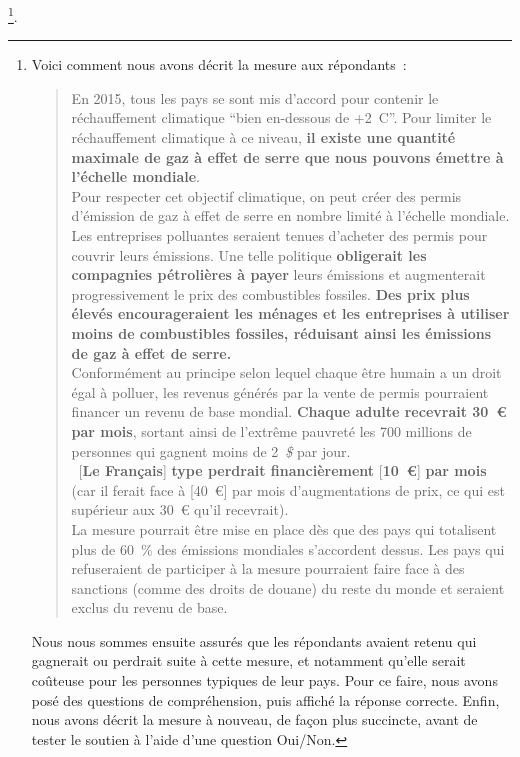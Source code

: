 \documentclass[a5paper,french,openany]{memoir}
\begin{document}
\footnote{\label{fn15}
Voici comment nous avons décrit la mesure aux répondants~:
\begin{quote}
En 2015, tous les pays se sont mis d'accord pour contenir le réchauffement climatique ``bien en-dessous de +2~\textdegree{}C''. Pour limiter le réchauffement climatique à ce niveau, \textbf{il existe une quantité maximale de gaz à effet de serre que nous pouvons émettre à l'échelle mondiale}. \\
Pour respecter cet objectif climatique, on peut créer des permis d'émission de gaz à effet de serre en nombre limité à l'échelle mondiale. Les entreprises polluantes seraient tenues d'acheter des permis pour couvrir leurs émissions. Une telle politique \textbf{obligerait les compagnies pétrolières à payer} leurs émissions et augmenterait progressivement le prix des combustibles fossiles. \textbf{Des prix plus élevés encourageraient les ménages et les entreprises à utiliser moins de combustibles fossiles, réduisant ainsi les émissions de gaz à effet de serre.} \\
Conformément au principe selon lequel chaque être humain a un droit égal à polluer, les revenus générés par la vente de permis pourraient financer un revenu de base mondial. \textbf{Chaque adulte recevrait 30~\euro{} par mois}, sortant ainsi de l'extrême pauvreté les 700 millions de personnes qui gagnent moins de 2~\textit{\$} par jour. \\
~[\textbf{Le Français}]\textbf{ type perdrait financièrement }[\textbf{10~\euro{}}]\textbf{ par mois}\footnotemark{\label{fn16}} 
(car il ferait face à [40~\euro{}] par mois d'augmentations de prix, ce qui est supérieur aux 30~\euro{} qu'il recevrait). \\
La mesure pourrait être mise en place dès que des pays qui totalisent plus de 60~\% des émissions mondiales s'accordent dessus. Les pays qui refuseraient de participer à la mesure pourraient faire face à des sanctions (comme des droits de douane) du reste du monde et seraient exclus du revenu de base.
\end{quote}
Nous nous sommes ensuite assurés que les répondants avaient retenu qui gagnerait ou perdrait suite à cette mesure, et notamment qu'elle serait coûteuse pour les personnes typiques de leur pays. Pour ce faire, nous avons posé des questions de compréhension, puis affiché la réponse correcte. Enfin, nous avons décrit la mesure à nouveau, de façon plus succincte, avant de tester le soutien à l'aide d'une question Oui/Non.}. 
\end{document}
